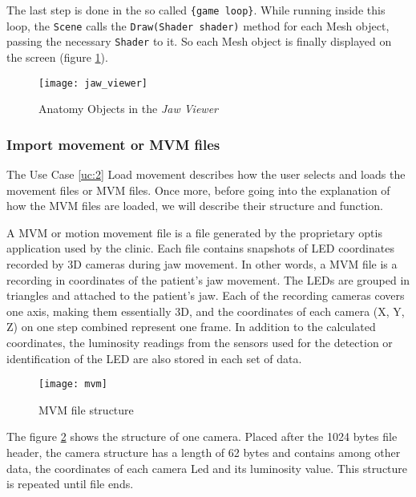 \noindent The last step is done in the so called \verb|{game loop}|. While running inside this loop, the \verb|Scene| calls the \verb|Draw(Shader shader)| method for each 
Mesh object, passing the necessary \verb|Shader| to it. So each Mesh object is finally displayed on the screen (figure \ref{fig:anatomy-objects}).

\begin{figure}[h!]
	\centering
	\texttt{[image: jaw\_viewer]}
	\caption{Anatomy Objects in the \emph{Jaw Viewer}}
	\label{fig:anatomy-objects}
\end{figure}




\subsubsection{Import movement or MVM files}

The Use Case \ref{uc:2} Load movement describes how the user selects and loads the movement files or \gls{MVM} files. Once more, before going into the explanation of how the MVM files are loaded, we will describe their structure and function.


 \label{mvm-file}

A MVM or motion movement file is a file generated by the proprietary \gls{optis} application used by the clinic. Each file contains snapshots of LED coordinates recorded by 3D cameras during jaw movement. In other words, a MVM file is a recording in coordinates of the patient's jaw movement.
The LEDs are grouped in triangles and attached to the patient's jaw. Each of the recording cameras covers one axis, making them essentially 3D, and the coordinates of each camera (X, Y, Z) on one step combined represent one \gls{frame}. In addition to the calculated coordinates, the luminosity readings from the sensors used for the detection or identification of the LED are also stored in each set of data.
\begin{figure}[h!]
	\centering
	\texttt{[image: mvm]}
	\caption{MVM file structure}
	\label{fig:mvm-structure}
\end{figure}

The figure \ref{fig:mvm-structure} shows the structure of one camera. Placed after the 1024 bytes file header, the camera structure has a length of 62 bytes and contains among other data, the coordinates of each camera Led and its luminosity value. This structure is repeated until file ends.

